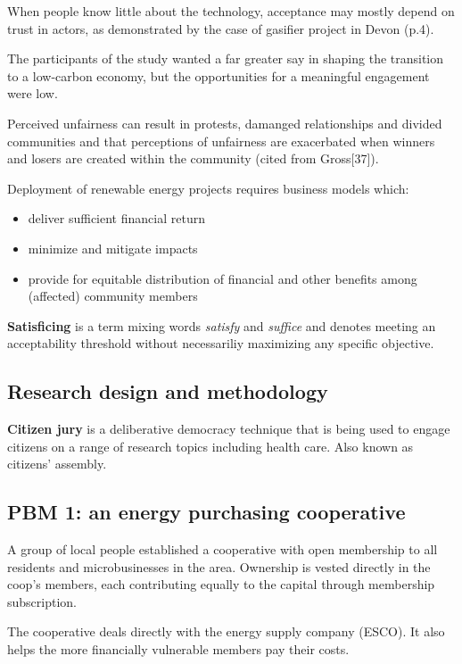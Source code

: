 When people know little about the technology, acceptance may mostly depend on
trust in actors, as demonstrated by the case of gasifier project in Devon
(p.4).

The participants of the study wanted a far greater say in shaping the
transition to a low-carbon economy, but the opportunities for a meaningful
engagement were low.

Perceived unfairness can result in protests, damanged relationships and divided
communities and that perceptions of unfairness are exacerbated when winners and
losers are created within the community (cited from Gross[37]).

Deployment of renewable energy projects requires business models which:
\begin{itemize}
	\item deliver sufficient financial return
	\item minimize and mitigate impacts
	\item provide for equitable distribution of financial and other
	benefits among (affected) community members
\end{itemize}

\textbf{Satisficing} is a term mixing words \textit{satisfy} and
\textit{suffice} and denotes meeting an acceptability threshold without
necessariliy maximizing any specific objective.

\subsection{Research design and methodology}

\textbf{Citizen jury} is a deliberative democracy technique that is being used
to engage citizens on a range of research topics including health care. Also
known as citizens' assembly.

\subsection{PBM 1: an energy purchasing cooperative}

A group of local people established a cooperative with open membership to all
residents and microbusinesses in the area. Ownership is vested directly in the
coop's members, each contributing equally to the capital through membership
subscription.

The cooperative deals directly with the energy supply company (ESCO). It also
helps the more financially vulnerable members pay their costs.

